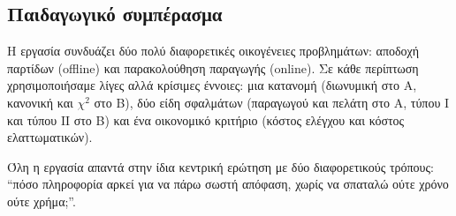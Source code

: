 \documentclass[12pt,a4paper]{article}
\begin{document}
\subsection*{Παιδαγωγικό συμπέρασμα}

Η εργασία συνδυάζει δύο πολύ διαφορετικές οικογένειες προβλημάτων: αποδοχή
παρτίδων (offline) και παρακολούθηση παραγωγής (online). Σε κάθε περίπτωση
χρησιμοποιήσαμε λίγες αλλά κρίσιμες έννοιες: μια κατανομή (διωνυμική στο
Α, κανονική και \(\chi^2\) στο Β), δύο είδη σφαλμάτων (παραγωγού και πελάτη
στο Α, τύπου Ι και τύπου ΙΙ στο Β) και ένα οικονομικό κριτήριο (κόστος
ελέγχου και κόστος ελαττωματικών).

Όλη η εργασία απαντά στην ίδια κεντρική ερώτηση με δύο διαφορετικούς
τρόπους: ``πόσο πληροφορία αρκεί για να πάρω σωστή απόφαση, χωρίς να
σπαταλώ ούτε χρόνο ούτε χρήμα;''.
\end{document}

